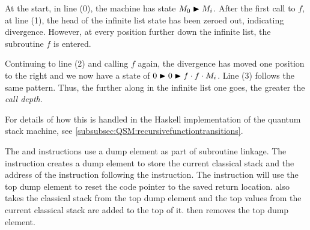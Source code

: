 At the start, in line (0), the machine has state $M_0\blacktriangleright M_i$. After the
first call to $f$, at line (1), 
the head of the infinite list state has been zeroed out, 
indicating divergence. However, at every position further down the
infinite list, the subroutine $f$ is entered.

Continuing to line (2) and calling $f$ again, the divergence has moved 
one position to the right and we now have a state of
 $0\blacktriangleright 0\blacktriangleright f \cdot f \cdot M_i$. Line (3) follows the same pattern.
 Thus, the further 
along in the infinite list one goes, the greater the \emph{call depth}.

 For  details of how this is
handled in the Haskell implementation of the quantum stack machine, 
see \vref{subsubsec:QSM:recursivefunctiontransitions}.

The  and  instructions use a dump element
as part of subroutine linkage.
The  instruction creates a dump element to store 
the 
current classical stack and the address of the instruction following
the  instruction. 
The  instruction will use the top dump element
to reset the code pointer  to the saved return location.
 also takes the classical stack from the top dump element and the
top  values from the current classical stack are added
to the top of it.  then removes the top dump element.


